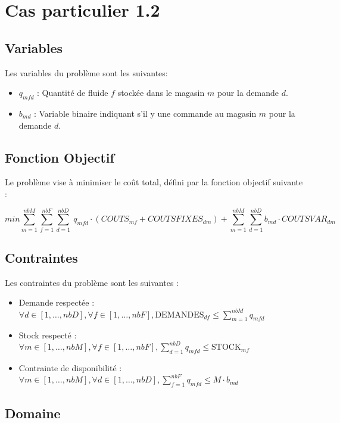 \section{Cas particulier 1.2}


\subsection{Variables}

Les variables du problème sont les suivantes:

\begin{itemize}
    \item $q_{mfd}$ : Quantité de fluide $f$ stockée dans le magasin $m$ pour la demande $d$.
    \item $b_{md}$ : Variable binaire indiquant s'il y une commande au magasin $m$ pour la demande $d$.
\end{itemize}

\subsection{Fonction Objectif}

Le problème vise à minimiser le coût total, défini par la fonction objectif suivante :

\[
min \sum_{m=1}^{nbM} \sum_{f=1}^{nbF} \sum_{d=1}^{nbD}\ q_{mfd} \cdot (COUTS_{mf}
+ COUTSFIXES_{dm})
+ \sum_{m=1}^{nbM} \sum_{d=1}^{nbD} b_{md} \cdot COUTSVAR_{dm}
\]

\subsection{Contraintes}

Les contraintes du problème sont les suivantes :

\begin{itemize}
    \item Demande respectée : $\forall d \in [1, \ldots, nbD], \forall f \in [1, \ldots, nbF], \text{DEMANDES}_{df} \leq \sum\limits_{m=1}^{nbM} q_{mfd}$
    \item Stock respecté : $\forall m \in [1, \ldots, nbM], \forall f \in [1, \ldots, nbF], \sum\limits_{d=1}^{nbD} q_{mfd} \leq \text{STOCK}_{mf}$
    \item Contrainte de disponibilité : $\forall m \in [1, \ldots, nbM], \forall d \in [1, \ldots, nbD], \sum\limits_{f=1}^{nbF} q_{mfd} \leq M \cdot b_{md}$
\end{itemize}

\subsection{Domaine}

